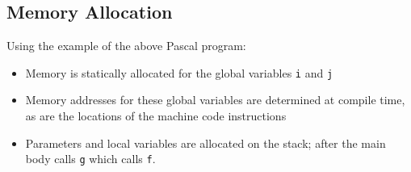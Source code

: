 \subsection{Memory Allocation}
Using the example of the above Pascal program:
\begin{itemize}
    \item Memory is statically allocated for the global variables \verb|i| and \verb|j|
    \item Memory addresses for these global variables are determined at compile time, as are the locations of the machine code instructions
    \item Parameters and local variables are allocated on the stack; after the main body calls \verb|g| which calls \verb|f|.
\end{itemize}